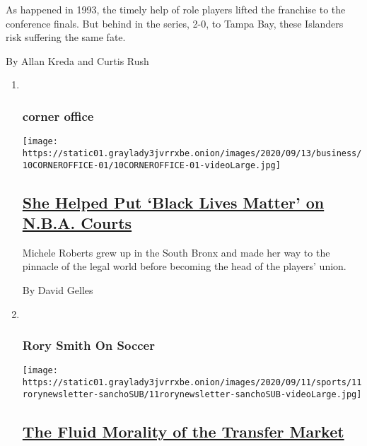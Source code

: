 \begin{enumerate}
  As happened in 1993, the timely help of role players lifted the
  franchise to the conference finals. But behind in the series, 2-0, to
  Tampa Bay, these Islanders risk suffering the same fate.

  By Allan Kreda and Curtis Rush
\end{enumerate}

\begin{enumerate}
\def\labelenumi{\arabic{enumi}.}
\item ~
  \hypertarget{corner-office}{%
  \subsubsection{corner office}\label{corner-office}}

  \texttt{[image: https://static01.graylady3jvrrxbe.onion/images/2020/09/13/business/10CORNEROFFICE-01/10CORNEROFFICE-01-videoLarge.jpg]}

  \hypertarget{she-helped-put-black-lives-matter-on-nba-courts}{%
  \subsection{\texorpdfstring{\href{/2020/09/11/business/michele-roberts-nba-corner-office.html}{She
  Helped Put `Black Lives Matter' on N.B.A.
  Courts}}{She Helped Put `Black Lives Matter' on N.B.A. Courts}}\label{she-helped-put-black-lives-matter-on-nba-courts}}

  Michele Roberts grew up in the South Bronx and made her way to the
  pinnacle of the legal world before becoming the head of the players'
  union.

  By David Gelles
\item ~
  \hypertarget{rory-smith-on-soccer}{%
  \subsubsection{Rory Smith On Soccer}\label{rory-smith-on-soccer}}

  \texttt{[image: https://static01.graylady3jvrrxbe.onion/images/2020/09/11/sports/11rorynewsletter-sanchoSUB/11rorynewsletter-sanchoSUB-videoLarge.jpg]}

  \hypertarget{the-fluid-morality-of-the-transfer-market}{%
  \subsection{\texorpdfstring{\href{/2020/09/11/sports/soccer/premier-league-transfer-window.html}{The
  Fluid Morality of the Transfer
  Market}}{The Fluid Morality of the Transfer Market}}\label{the-fluid-morality-of-the-transfer-market}}


\end{enumerate}
